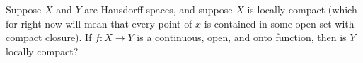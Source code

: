 \documentclass[12pt]{pset}
\begin{document}
\begin{problem}

  Suppose $X$ and $Y$ are Hausdorff spaces, and suppose $X$ is locally
  compact (which for right now will mean that every point of $x$ is
  contained in some open set with compact closure).  If $f : X \to Y$
  is a continuous, open, and onto function, then is $Y$ locally
  compact?
  
\end{problem}
\end{document}
